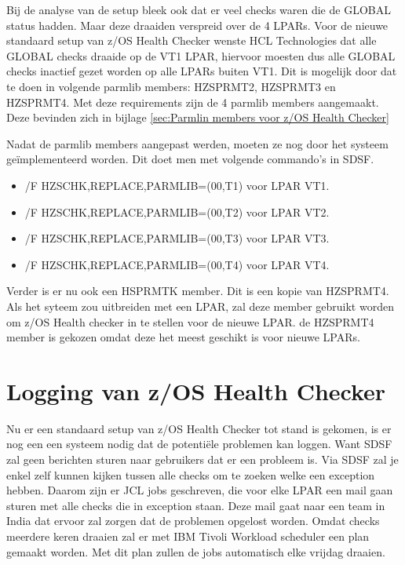Bij de analyse van de setup bleek ook dat er veel checks waren die de GLOBAL status hadden. Maar deze draaiden verspreid over de 4 LPARs. Voor de nieuwe standaard setup van z/OS Health Checker wenste HCL Technologies dat alle GLOBAL checks draaide op de VT1 LPAR, hiervoor moesten dus alle GLOBAL checks inactief gezet worden op alle LPARs buiten VT1. Dit is mogelijk door dat te doen in volgende parmlib members: HZSPRMT2, HZSPRMT3 en HZSPRMT4. Met deze requirements zijn de 4 parmlib members aangemaakt. Deze bevinden zich in bijlage \ref{sec:Parmlin members voor z/OS Health Checker}

Nadat de parmlib members aangepast werden, moeten ze nog door het systeem geïmplementeerd worden. Dit doet men met volgende commando's in SDSF.

\begin{itemize}
	\item /F HZSCHK,REPLACE,PARMLIB=(00,T1) voor LPAR VT1. 
	\item /F HZSCHK,REPLACE,PARMLIB=(00,T2) voor LPAR VT2.
	\item /F HZSCHK,REPLACE,PARMLIB=(00,T3) voor LPAR VT3.
	\item /F HZSCHK,REPLACE,PARMLIB=(00,T4) voor LPAR VT4.
\end{itemize}

Verder is er nu ook een HSPRMTK member. Dit is een kopie van HZSPRMT4. Als het syteem zou uitbreiden met een LPAR, zal deze member gebruikt worden om z/OS Health checker in te stellen voor de nieuwe LPAR. de HZSPRMT4 member is gekozen omdat deze het meest geschikt is voor nieuwe LPARs.

\section{Logging van z/OS Health Checker}
\label{sec:Logging van z/OS Health Checker}

Nu er een standaard setup van z/OS Health Checker tot stand is gekomen, is er nog een een systeem nodig dat de potentiële problemen kan loggen. Want SDSF zal geen berichten sturen naar gebruikers dat er een probleem is. Via SDSF zal je enkel zelf kunnen kijken tussen alle checks om te zoeken welke een exception hebben. Daarom zijn er JCL jobs geschreven, die voor elke LPAR een mail gaan sturen met alle checks die in exception staan. Deze mail gaat naar een team in India dat ervoor zal zorgen dat de problemen opgelost worden. Omdat checks meerdere keren draaien zal er met IBM Tivoli Workload scheduler een plan gemaakt worden. Met dit plan zullen de jobs automatisch elke vrijdag draaien.

